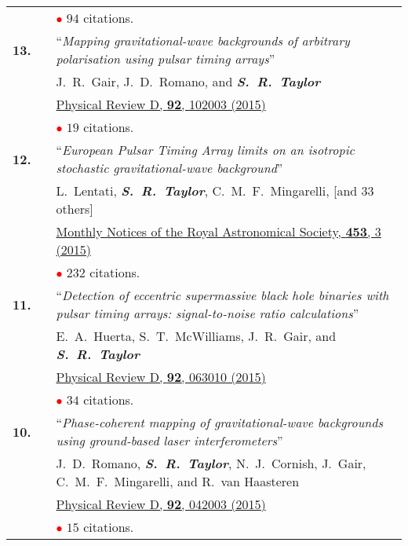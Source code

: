 \documentclass[11pt,letterpaper,sans]{moderncv}
\begin{document}
{\begin{longtable}{rp{0.3cm}p{15.8cm}}
&& \textcolor{red}{$\bullet$} $94$ citations. \vspace{0.09cm}\\
\textbf{13.} & & ``\textit{Mapping gravitational-wave backgrounds of arbitrary polarisation using pulsar timing arrays}'' \\ 
&& J.~R.~Gair, J.~D.~Romano, and \textit{\textbf{S.~R.~Taylor}} \\ 
&& \href{http://journals.aps.org/prd/abstract/10.1103/PhysRevD.92.102003}{{\color{color1} Physical Review D, \textbf{92}, 102003 (2015)}} \\
&& \textcolor{red}{$\bullet$} $19$ citations. \vspace{0.09cm}\\
\textbf{12.} & & ``\textit{European Pulsar Timing Array limits on an isotropic stochastic gravitational-wave background}'' \\ 
&& L.~Lentati, \textit{\textbf{S.~R.~Taylor}}, C.~M.~F.~Mingarelli, [and 33 others] \\ 
&& \href{http://mnras.oxfordjournals.org/content/453/3/2576}{{\color{color1} Monthly Notices of the Royal Astronomical Society, \textbf{453}, 3 (2015)}} \\
&& \textcolor{red}{$\bullet$} $232$ citations. \vspace{0.09cm}\\
\textbf{11.} & & ``\textit{Detection of eccentric supermassive black hole binaries with pulsar timing arrays: signal-to-noise ratio calculations}'' \\ && E.~A.~Huerta, S.~T.~McWilliams, J.~R.~Gair, and \textit{\textbf{S.~R.~Taylor}} \\ 
&& \href{http://journals.aps.org/prd/abstract/10.1103/PhysRevD.92.063010}{{\color{color1} Physical Review D, \textbf{92}, 063010 (2015)}} \\
&& \textcolor{red}{$\bullet$} $34$ citations. \vspace{0.09cm}\\
\textbf{10.} & & ``\textit{Phase-coherent mapping of gravitational-wave backgrounds using ground-based laser interferometers}'' \\ 
&& J.~D.~Romano, \textit{\textbf{S.~R.~Taylor}}, N.~J.~Cornish, J.~Gair, C.~M.~F.~Mingarelli, and R.~van Haasteren \\ 
&& \href{http://journals.aps.org/prd/abstract/10.1103/PhysRevD.92.042003}{{\color{color1} Physical Review D, \textbf{92}, 042003 (2015)}} \\
&& \textcolor{red}{$\bullet$} $15$ citations. \vspace{0.09cm}\\

\end{longtable}}
\end{document}
